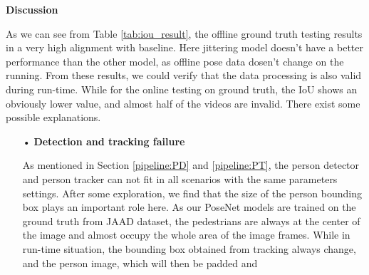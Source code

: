 \textbf{Discussion}

As we can see from Table \ref{tab:iou_result}, the offline ground truth testing results in a very high alignment with baseline. Here jittering model doesn't have a better performance than the other model, as offline pose data dosen't change on the running. From these results, we could verify that the data processing is also valid during run-time. While for the online testing on ground truth, the IoU shows an obviously lower value, and almost half of the videos are invalid. There exist some possible explanations. 

\begin{itemize}
\item[•] \textbf{Detection and tracking failure} 

As mentioned in Section \ref{pipeline:PD} and \ref{pipeline:PT}, the person detector and person tracker can not fit in all scenarios with the same parameters settings. After some exploration, we find that the size of the person bounding box plays an important role here. As our PoseNet models are trained on the ground truth from JAAD dataset, the pedestrians are always at the center of the image and almost occupy the whole area of the image frames. While in run-time situation, the bounding box obtained from tracking always change, and the person image, which will then be padded and   


\end{itemize}   
















